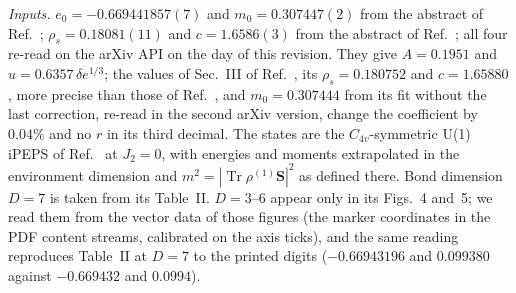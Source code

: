 \documentclass[aps,prx,onecolumn,10pt,nofootinbib,longbibliography,floatfix]{revtex4-2}
\theoremstyle{remark}
\newcommand{\de}{\delta e}
\newcommand{\Tr}{\operatorname{Tr}}
\begin{document}
\emph{Inputs.} $e_0=-0.669441857(7)$ and $m_0=0.307447(2)$ from the abstract of Ref.~\cite{sandvik2026}; %
$\rho_s=0.18081(11)$ and $c=1.6586(3)$ from the abstract of Ref.~\cite{jiang2011}; all four re-read on the arXiv API %
on the day of this revision. They give $A=0.1951$ and $u=0.6357\,\de^{1/3}$; the values of Sec.~III of %
Ref.~\cite{sandvik2026}, its $\rho_s=0.180752$ and $c=1.65880$, more precise than those of Ref.~\cite{jiang2011}, and %
$m_0=0.307444$ from its fit without the last correction, re-read in the second arXiv version, change the coefficient by %
$0.04\%$ and no $r$ in its third decimal. The states are the $C_{4v}$-symmetric U(1) iPEPS of %
Ref.~\cite{hasik2021} at $J_2=0$, with energies and moments extrapolated in the environment dimension and
$m^2=|\Tr\rho^{(1)}\bm S|^2$ as defined there. Bond dimension $D=7$ is taken from its Table~II. $D=3$--$6$ appear only %
in its Figs.~4 and~5; we read them from the vector data of those figures (the marker coordinates in the PDF content %
streams, calibrated on the axis ticks), and the same reading reproduces Table~II at $D=7$ to the printed digits
($-0.66943196$ and $0.099380$ against $-0.669432$ and $0.0994$). %
\end{document}
